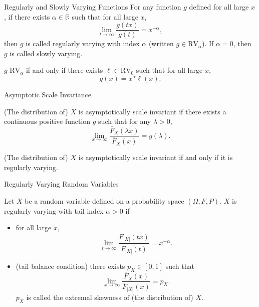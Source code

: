 \documentclass{beamer}
\def\R{\mathbb R}
\def\RV{\text{RV}}
\begin{document}
\begin{frame}{Regularly and Slowly Varying Functions}
    For any function $g$ defined for all large $x$, if there exists $\alpha \in \R$ such that for all large $x$,
    \[
    \lim_{t \to \infty} \frac{g(t x)}{g(t)} = x^{-\alpha},
    \]
    then $g$ is called regularly varying with index $\alpha$ (written $g \in \RV_{\alpha}$). If $\alpha = 0$, then $g$ is called slowly varying.
    \begin{theorem}
        $g$ \in $\RV_{\alpha}$ if and only if there exists $\ell \in \RV_0$ such that for all large $x$,
        \[
        g(x) = x^{\alpha}\ell(x).
        \]
    \end{theorem}
\end{frame}

\begin{frame}{Asymptotic Scale Invariance}
    \begin{definition}
        (The distribution of) $X$ is asymptotically scale invariant if there exists a continuous positive function $g$ such that for any $\lambda > 0$,
        \[
        \lim_{x \to \infty} \frac{\bar{F}_X(\lambda x)}{\bar{F}_X(x)} = g(\lambda).
        \]
    \end{definition}
    \begin{theorem}
        (The distribution of) $X$ is asymptotically scale invariant if and only if it is regularly varying.
    \end{theorem}
\end{frame}

\begin{frame}{Regularly Varying Random Variables}
    \begin{definition}
        Let $X$ be a random variable defined on a probability space $(\Omega, F, P)$. $X$ is regularly varying with tail index $\alpha > 0$ if
        \begin{itemize}
            \item for all large $x$,
            \[
            \lim_{t \to \infty} \frac{\bar{F}_{|X|}(t x)}{\bar{F}_{|X|}(t)} = x^{-\alpha}.
            \]
            \item (tail balance condition) there exists $p_X \in [0, 1]$ such that
            \[
            \lim_{x \to \infty} \frac{\bar{F}_X(x)}{\bar{F}_{|X|}(x)} = p_X.
            \]
            $p_X$ is called the extremal skewness of (the distribution of) $X$.
        \end{itemize}
    \end{definition}
\end{frame}
\end{document}
